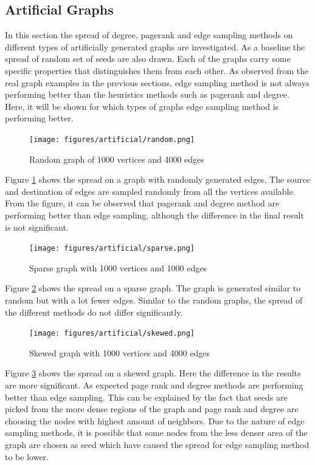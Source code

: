 \documentclass[english]{tktltiki}
\begin{document}
\subsection{Artificial Graphs}
In this section the spread of degree, pagerank and edge sampling methods on different types of artificially generated graphs are investigated. As a baseline the spread of random set of seeds are also drawn. Each of the graphs carry some specific properties that distinguishes them from each other. As observed from the real graph examples in the previous sections, edge sampling method is not always performing better than the heuristics methods such as pagerank and degree. Here, it will be shown for which types of graphs edge sampling method is performing better. 
\begin{figure}[ht!]
\centering
\texttt{[image: figures/artificial/random.png]}
\caption{Random graph of 1000 vertices and 4000 edges}
\label{art:random}
\end{figure}

Figure \ref{art:random} shows the spread on a graph with randomly generated edges. The source and destination of edges are sampled randomly from all the vertices available. From the figure, it can be observed that pagerank and degree method are performing better than edge sampling, although the difference in the final result is not significant. 

\begin{figure}[ht!]
\centering
\texttt{[image: figures/artificial/sparse.png]}
\caption{Sparse graph with 1000 vertices and 1000 edges}
\label{art:sparse}
\end{figure}

Figure \ref{art:sparse} shows the spread on a sparse graph. The graph is generated similar to random but with a lot fewer edges. Similar to the random graphs, the spread of the different methods do not differ significantly.

\begin{figure}[ht!]
\centering
\texttt{[image: figures/artificial/skewed.png]}
\caption{Skewed graph with 1000 vertices and 4000 edges}
\label{art:skewed}
\end{figure}

Figure \ref{art:skewed} shows the spread on a skewed graph. Here the difference in the results are more significant. As expected page rank and degree methods are performing better than edge sampling. This can be explained by the fact that seeds are picked from the more dense regions of the graph and page rank and degree  are choosing the nodes with highest amount of neighbors. Due to the nature of edge sampling methods, it is possible that some nodes from the less denser area of the graph are chosen as seed which have caused the spread for edge sampling method to be lower.
\end{document}
